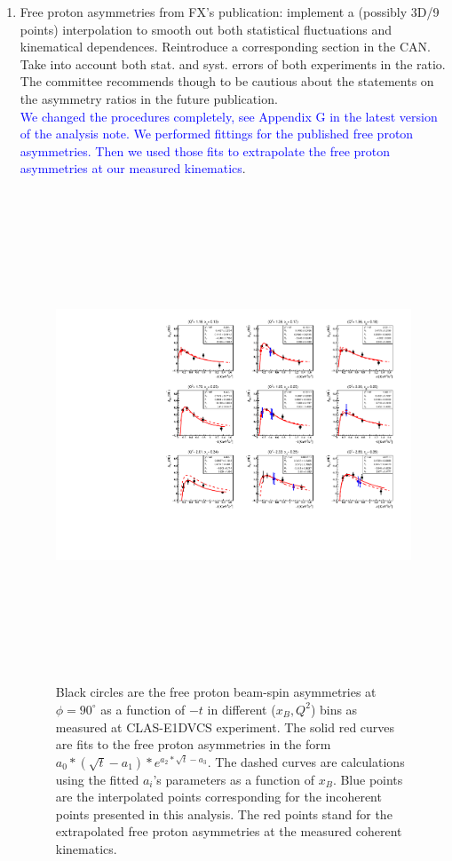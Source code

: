 \begin{enumerate}
\begin{enumerate}
\end{enumerate}

\item Free proton asymmetries from FX's publication: implement a (possibly 3D/9 
points) interpolation to smooth out both statistical fluctuations and 
kinematical dependences. Reintroduce a corresponding section in the CAN. Take 
into account both stat. and syst. errors of both experiments in the ratio. The 
committee recommends though to be cautious about the statements on the 
asymmetry ratios in the future publication.\\
  \textcolor{blue}{We changed the procedures completely, see Appendix G in the 
  latest version of the analysis note. We performed fittings for the published 
  free proton asymmetries. Then we used those fits to extrapolate the free 
  proton asymmetries at our measured kinematics}.\\
  \begin{figure}[tbp]
    \includegraphics[height=14.6cm]{fig/ALU-proton-fits.pdf}
    \caption{Black circles are the free proton beam-spin asymmetries at $\phi = 
    90   ^{\circ}$ as a function of $-t$ in different ($x_B, Q^2$) bins as 
    measured at CLAS-E1DVCS experiment. The solid red curves are fits to the 
    free proton asymmetries in the form 
    $a_{0}*(\sqrt{t}-a_{1})*e^{a_{2}*\sqrt{t} - a_{3}}$. The dashed curves are 
    calculations using the fitted $a_{i}$'s parameters as
 a function of $x_B$. Blue points are the interpolated points corresponding for 
 the incoherent points presented
 in this analysis. The red points stand for the extrapolated free proton
 asymmetries at the measured coherent kinematics.}
    \label{fig:free-proton-alu-fits}
    \end{figure}


\end{enumerate}
